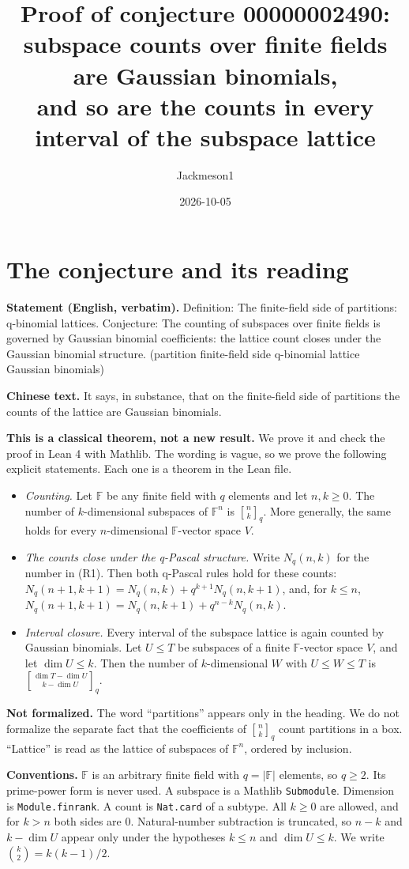 \documentclass[11pt]{article}
\title{Proof of conjecture 00000002490:\\ subspace counts over finite fields are Gaussian binomials,\\ and so are the counts in every interval of the subspace lattice}
\author{Jackmeson1}
\date{2026-10-05}
\theoremstyle{definition}
\newcommand{\qb}[2]{\genfrac{[}{]}{0pt}{}{#1}{#2}_{q}}
\newcommand{\F}{\mathbb{F}}
\begin{document}
\maketitle

\section{The conjecture and its reading}

\textbf{Statement (English, verbatim).} Definition: The finite-field side of partitions:
q-binomial lattices. Conjecture: The counting of subspaces over finite fields is governed by
Gaussian binomial coefficients: the lattice count closes under the Gaussian binomial structure.
(partition finite-field side q-binomial lattice Gaussian binomials)

\textbf{Chinese text.} It says, in substance, that on the finite-field side of partitions the
counts of the lattice are Gaussian binomials.

\textbf{This is a classical theorem, not a new result.} We prove it and check the proof in
Lean 4 with Mathlib. The wording is vague, so we prove the following explicit statements. Each
one is a theorem in the Lean file.
\begin{itemize}
\item[(R1)] \emph{Counting.} Let $\F$ be any finite field with $q$ elements and let $n,k\ge 0$.
  The number of $k$-dimensional subspaces of $\F^n$ is $\qb{n}{k}$. More generally, the same
  holds for every $n$-dimensional $\F$-vector space $V$.
\item[(R2)] \emph{The counts close under the q-Pascal structure.} Write $N_q(n,k)$ for the
  number in (R1). Then both q-Pascal rules hold for these counts:
  $N_q(n+1,k+1)=N_q(n,k)+q^{k+1}N_q(n,k+1)$, and, for $k\le n$,
  $N_q(n+1,k+1)=N_q(n,k+1)+q^{n-k}N_q(n,k)$.
\item[(R3)] \emph{Interval closure.} Every interval of the subspace lattice is again counted by
  Gaussian binomials. Let $U\le T$ be subspaces of a finite $\F$-vector space $V$, and let
  $\dim U\le k$. Then the number of $k$-dimensional $W$ with $U\le W\le T$ is
  $\qb{\dim T-\dim U}{k-\dim U}$.
\end{itemize}
\textbf{Not formalized.} The word ``partitions'' appears only in the heading. We do not
formalize the separate fact that the coefficients of $\qb{n}{k}$ count partitions in a box.
``Lattice'' is read as the lattice of subspaces of $\F^n$, ordered by inclusion.

\textbf{Conventions.} $\F$ is an arbitrary finite field with $q=|\F|$ elements, so $q\ge 2$.
Its prime-power form is never used. A subspace is a Mathlib \texttt{Submodule}. Dimension is
\texttt{Module.finrank}. A count is \texttt{Nat.card} of a subtype. All $k\ge 0$ are allowed,
and for $k>n$ both sides are $0$. Natural-number subtraction is truncated, so $n-k$ and
$k-\dim U$ appear only under the hypotheses $k\le n$ and $\dim U\le k$. We write
$\binom{k}{2}=k(k-1)/2$.
\end{document}
